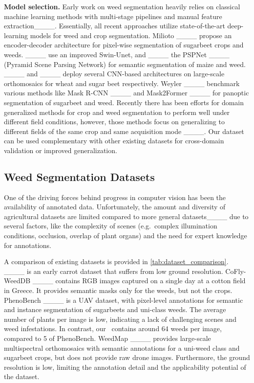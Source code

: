 \noindent \textbf{Model selection.}
Early work on weed segmentation heavily relies on classical machine learning methods with multi-stage pipelines and manual feature extraction____.
Essentially, all recent approaches utilize state-of-the-art deep-learning models for weed and crop segmentation.
Milioto \etal ____ propose an encoder-decoder architecture for pixel-wise segmentation of sugarbeet crops and weeds.
____ use an improved Swin-Unet, and ____ the PSPNet ____ (Pyramid Scene Parsing Network) for semantic segmentation of maize and weed. 
____ and ____ deploy several CNN-based architectures on large-scale orthomosaics for wheat and sugar beet respectively.
Weyler \etal ____ benchmark various methods like Mask R-CNN ____ and Mask2Former ____ for panoptic segmentation of sugarbeet and weed.
Recently there has been efforts for domain generalized methods for crop and weed segmentation to perform well under different field conditions, however, those methods focus on generalizing to different fields of the same crop and same acquisition mode ____. Our dataset can be used complementary with other existing datasets for cross-domain validation or improved generalization.

\subsection{Weed Segmentation Datasets}
One of the driving forces behind progress in computer vision has been the availability of annotated data.
Unfortunately,
the amount and diversity of agricultural datasets are limited compared to more general datasets____
due to several factors, like the complexity of scenes (e.g.~complex illumination conditions, occlusion, overlap of plant organs) and the need for expert knowledge for annotations.

A comparison of existing datasets is provided in \cref{tab:dataset_comparison}. ____ is an early carrot dataset that suffers from low ground resolution.
CoFly-WeedDB ____ contains RGB images captured on a single day at a cotton field in Greece.
It provides semantic masks only for the weeds, but not the crops.
PhenoBench ____ is a UAV dataset, with pixel-level annotations for semantic and instance segmentation of sugarbeets and uni-class weeds.
The average number of plants per image is low, indicating a lack of challenging scenes and weed infestations.
In contrast, our \dname~contains around 64 weeds per image, compared to 5 of PhenoBench. WeedMap ____ provides large-scale multispectral orthomosaics with semantic annotations for a uni-weed class and sugarbeet crops, but does not provide raw drone images.
Furthermore, the ground resolution is low, limiting the annotation detail and the applicability potential of the dataset.

